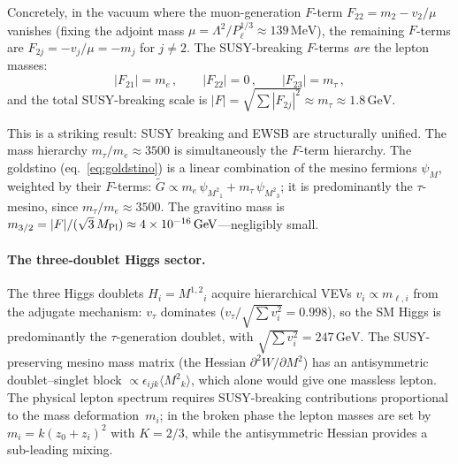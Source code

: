 \documentclass[12pt,a4paper]{article}
\newcommand{\MeV}{\,\mathrm{MeV}}
\newcommand{\GeV}{\,\mathrm{GeV}}
\begin{document}
Concretely, in the vacuum where the
muon-generation $F$-term $F_{22} = m_2 - v_2/\mu$ vanishes (fixing the
adjoint mass $\mu = \Lambda^2/P_\ell^{1/3} \approx 139\MeV$), the
remaining $F$-terms are
$F_{2j} = -v_j/\mu = -m_j$ for $j\ne 2$.  The SUSY-breaking $F$-terms
\emph{are} the lepton masses:
\begin{equation}
  |F_{21}| = m_e\,, \qquad
  |F_{22}| = 0\,, \qquad
  |F_{23}| = m_\tau\,,
  \label{eq:Fterms_lepton}
\end{equation}
and the total SUSY-breaking scale is
$|F| = \sqrt{\sum |F_{2j}|^2} \approx m_\tau \approx 1.8\GeV$.

This is a striking result: SUSY breaking and EWSB are structurally
unified. The mass hierarchy $m_\tau/m_e \approx 3500$ is
simultaneously the $F$-term hierarchy.  The goldstino
(eq.~\ref{eq:goldstino}) is a linear combination of the mesino
fermions $\psi_M$, weighted by their $F$-terms:
$\tilde{G} \propto m_e\,\psi_{M^2{}_1} + m_\tau\,\psi_{M^2{}_3}$;
it is predominantly the $\tau$-mesino, since
$m_\tau/m_e \approx 3500$.
The gravitino mass is $m_{3/2} = |F|/(\sqrt{3}\,M_{\rm Pl})
\approx 4\times 10^{-16}\GeV$---negligibly small.

\paragraph{The three-doublet Higgs sector.}
The three Higgs doublets $H_i = M^{1,2}{}_i$ acquire hierarchical
VEVs $v_i \propto m_{\ell,i}$ from the adjugate mechanism: $v_\tau$
dominates ($v_\tau/\sqrt{\sum v_i^2} = 0.998$), so the SM Higgs is
predominantly the $\tau$-generation doublet, with $\sqrt{\sum v_i^2}
= 247\GeV$. The SUSY-preserving mesino mass matrix (the Hessian
$\partial^2 W/\partial M^2$) has an antisymmetric doublet--singlet
block $\propto\!\epsilon_{ijk}\langle M^2{}_k\rangle$, which alone would
give one massless lepton. The physical lepton spectrum requires
SUSY-breaking contributions proportional to the mass deformation~$m_i$;
in the broken phase the lepton masses are set by~$m_i=k(z_0+z_i)^2$
with $K=2/3$, while the antisymmetric Hessian provides a sub-leading
mixing.
\end{document}
